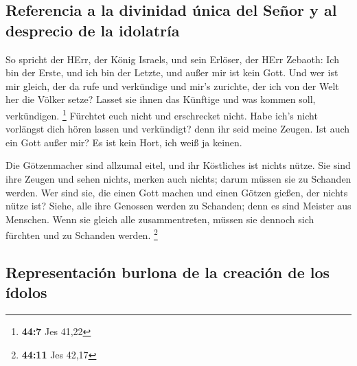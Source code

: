 \hypertarget{referencia-a-la-divinidad-uxfanica-del-seuxf1or-y-al-desprecio-de-la-idolatruxeda}{%
\subsection{Referencia a la divinidad única del Señor y al desprecio de
la
idolatría}\label{referencia-a-la-divinidad-uxfanica-del-seuxf1or-y-al-desprecio-de-la-idolatruxeda}}

 So spricht der HErr, der König Israels, und sein Erlöser,
der HErr Zebaoth: Ich bin der Erste, und ich bin der Letzte, und außer
mir ist kein Gott.  Und wer ist mir gleich, der da rufe
und verkündige und mir's zurichte, der ich von der Welt her die Völker
setze? Lasset sie ihnen das Künftige und was kommen soll, verkündigen.
\footnote{\textbf{44:7} Jes 41,22}  Fürchtet euch nicht
und erschrecket nicht. Habe ich's nicht vorlängst dich hören lassen und
verkündigt? denn ihr seid meine Zeugen. Ist auch ein Gott außer mir? Es
ist kein Hort, ich weiß ja keinen.

 Die Götzenmacher sind allzumal eitel, und ihr Köstliches
ist nichts nütze. Sie sind ihre Zeugen und sehen nichts, merken auch
nichts; darum müssen sie zu Schanden werden.  Wer sind
sie, die einen Gott machen und einen Götzen gießen, der nichts nütze
ist?  Siehe, alle ihre Genossen werden zu Schanden; denn
es sind Meister aus Menschen. Wenn sie gleich alle zusammentreten,
müssen sie dennoch sich fürchten und zu Schanden werden. \footnote{\textbf{44:11}
  Jes 42,17}

\hypertarget{representaciuxf3n-burlona-de-la-creaciuxf3n-de-los-uxeddolos}{%
\subsection{Representación burlona de la creación de los
ídolos}\label{representaciuxf3n-burlona-de-la-creaciuxf3n-de-los-uxeddolos}}

